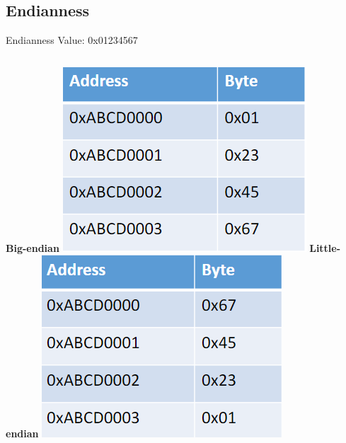 \documentclass[
	11pt, %
	aspectratio=169, %
]{beamer}
\begin{document}
\subsection{Endianness}
\begin{frame}{Endianness}{\sectiontitle}
    Value: 0x01234567
    \begin{columns}
        \textbf{Big-endian}
        \includegraphics[width=\textwidth]{./images/big-endian.png}
        \textbf{Little-endian}
        \includegraphics[width=\textwidth]{./images/little-endian.png}

    \end{columns}

\end{frame}
\end{document}
